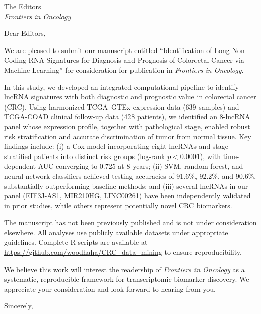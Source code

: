 \documentclass[12pt]{letter}
\begin{document}
\begin{letter}{The Editors\\
\textit{Frontiers in Oncology}}

\opening{Dear Editors,}

We are pleased to submit our manuscript entitled ``Identification of Long Non-Coding RNA Signatures for Diagnosis and Prognosis of Colorectal Cancer via Machine Learning'' for consideration for publication in \textit{Frontiers in Oncology}.

In this study, we developed an integrated computational pipeline to identify lncRNA signatures with both diagnostic and prognostic value in colorectal cancer (CRC). Using harmonized TCGA--GTEx expression data (639 samples) and TCGA-COAD clinical follow-up data (428 patients), we identified an 8-lncRNA panel whose expression profile, together with pathological stage, enabled robust risk stratification and accurate discrimination of tumor from normal tissue. Key findings include: (i) a Cox model incorporating eight lncRNAs and stage stratified patients into distinct risk groups (log-rank $p < 0.0001$), with time-dependent AUC converging to 0.725 at 8 years; (ii) SVM, random forest, and neural network classifiers achieved testing accuracies of 91.6\%, 92.2\%, and 90.6\%, substantially outperforming baseline methods; and (iii) several lncRNAs in our panel (EIF3J-AS1, MIR210HG, LINC00261) have been independently validated in prior studies, while others represent potentially novel CRC biomarkers.

The manuscript has not been previously published and is not under consideration elsewhere. All analyses use publicly available datasets under appropriate guidelines. Complete R scripts are available at \url{https://github.com/woodhaha/CRC_data_mining} to ensure reproducibility.

We believe this work will interest the readership of \textit{Frontiers in Oncology} as a systematic, reproducible framework for transcriptomic biomarker discovery. We appreciate your consideration and look forward to hearing from you.

\closing{Sincerely,}

\end{letter}
\end{document}
